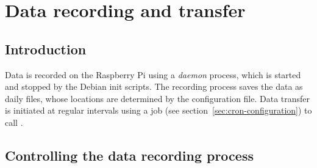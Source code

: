 \chapter{Data recording and transfer}

\section{Introduction}

Data is recorded on the Raspberry Pi using a \emph{daemon}
process, which is started and stopped by the Debian init scripts. The
recording process saves the data as daily files, whose locations are
determined by the  configuration file. Data
transfer is initiated at regular intervals using a  job
(see section~\ref{sec:cron-configuration}) to call .

\section{Controlling the data recording process}


